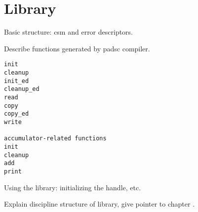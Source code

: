 \chapter{Library}


Basic structure: csm and error descriptors.

Describe functions generated by padsc compiler.

\begin{verbatim}
init
cleanup
init_ed
cleanup_ed
read
copy
copy_ed
write

accumulator-related functions
init
cleanup
add
print
\end{verbatim}

Using the library: initializing the handle, etc.


Explain discipline structure of library, give pointer to 
chapter .
